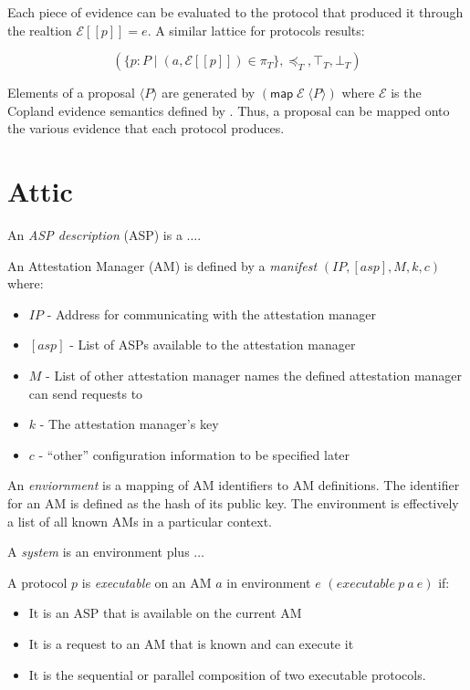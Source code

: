 \documentclass[sigconf,authordraft]{acmart}
\begin{document}
Each piece of evidence can be evaluated to the protocol that produced it through the realtion $\mathcal{E}[\![p]\!]=e$. A similar lattice for protocols results:

\[(\{p:P\mid
  (a,\mathcal{E}[\![p]\!])\in\pi_T\},\preceq_T,\top_T,\bot_T)\]

Elements of a proposal $\langle P\rangle$ are generated by
$(\mathsf{map}\; \mathcal{E}\; \langle P\rangle)$ where $\mathcal{E}$
is the Copland evidence semantics defined by \citet{Ramsdell:2019aa}.
Thus, a proposal can be mapped onto the various evidence that each
protocol produces.

\section{Attic}

An \emph{ASP description} (ASP) is a $\ldots$.

An Attestation Manager (AM) is defined by a \emph{manifest}
$(IP,[asp],M,k,c)$ where:

\begin{itemize}
  \squash
\item $IP$ - Address for communicating with the attestation manager
\item $[asp]$ - List of ASPs available to the attestation manager
\item $M$ - List of other attestation manager names the defined
  attestation manager can send requests to
\item $k$ - The attestation manager's key
\item $c$ - ``other'' configuration information to be specified later
\end{itemize}

An \emph{enviornment} is a mapping of AM identifiers to AM definitions.  The
identifier for an AM is defined as the hash of its public key.  The
environment is effectively a list of all known AMs in a particular context.

A \emph{system} is an environment plus $\ldots$ 

A protocol $p$ is \emph{executable} on an AM $a$ in environment $e$
$(executable\ p\ a\ e)$ if:

\begin{itemize}
\item It is an ASP that is available on the current AM
\item It is a request to an AM that is known and can execute it
\item It is the sequential or parallel composition of two executable
  protocols.
\end{itemize}
\end{document}
